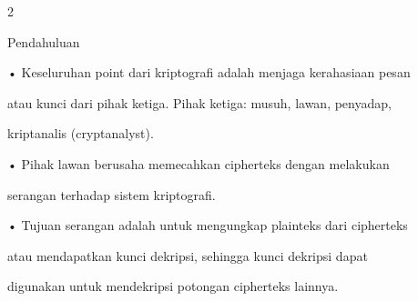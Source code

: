 \documentclass{article}
\begin{document}

2

Pendahuluan 

• Keseluruhan point dari kriptografi adalah menjaga kerahasiaan pesan 

atau kunci dari pihak ketiga. Pihak ketiga: musuh, lawan, penyadap, 

kriptanalis (cryptanalyst). 

• Pihak lawan berusaha memecahkan cipherteks dengan melakukan 

serangan terhadap sistem kriptografi.

• Tujuan serangan adalah untuk mengungkap plainteks dari cipherteks 

atau mendapatkan kunci dekripsi, sehingga kunci dekripsi dapat 

digunakan untuk mendekripsi potongan cipherteks lainnya.
\end{document}
